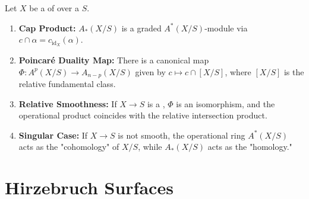 








\begin{proposition} 
Let $X$ be a  of  over a  $S$.
\begin{enumerate}
    \item \textbf{Cap Product:} $A_*(X/S)$ is a graded $A^*(X/S)$-module via $c \cap \alpha = c_{\mathrm{id}_X}(\alpha)$.
    \item \textbf{Poincaré Duality Map:} There is a canonical map $\Phi: A^p(X/S) \to A_{n-p}(X/S)$ given by $c \mapsto c \cap [X/S]$, where $[X/S]$ is the relative fundamental class.
    \item \textbf{Relative Smoothness:} If $X \to S$ is a , $\Phi$ is an isomorphism, and the operational product coincides with the relative intersection product.
    \item \textbf{Singular Case:} If $X \to S$ is not smooth, the operational ring $A^*(X/S)$ acts as the "cohomology" of $X/S$, while $A_*(X/S)$ acts as the "homology."
\end{enumerate}
\end{proposition}




\section{Hirzebruch Surfaces}



